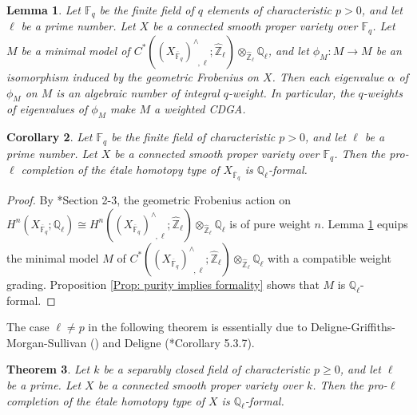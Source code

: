 \documentclass[11pt]{amsart}
\newtheorem{theorem}{Theorem}[section]
\newtheorem{lemma}[theorem]{Lemma}
\newtheorem{corollary}[theorem]{Corollary}
\theoremstyle{definition}
\numberwithin{equation}{section}
\numberwithin{equation}{section}
\newcommand\QQ{\mathbb{Q}}
\newcommand\ZZ{\mathbb{Z}}
\newcommand\FF{\mathbb{F}}
\DeclareMathOperator{\et}{\acute{e}t}
\begin{document}
\begin{lemma}\label{Lem: Frobenius weight on minimal model}
Let $\FF_q$ be the finite field of $q$ elements of characteristic $p>0$, and let $\ell$ be a prime number. Let $X$ be a connected smooth proper variety over $\FF_{q}$. Let $M$ be a minimal model of $C^*((X_{\overline{\FF}_q})^{\wedge}_{\et,\ell};\widehat{\ZZ}_{\ell})\otimes_{\widehat{\ZZ}_{\ell}} \QQ_{\ell}$, and let $\phi_M:M\rightarrow M$ be an isomorphism induced by the geometric Frobenius on $X$. Then
each eigenvalue $\alpha$ of $\phi_M$ on $M$ is an algebraic number of integral $q$-weight. In particular, the $q$-weights of eigenvalues of $\phi_M$ make $M$ a weighted CDGA.
\end{lemma}


\begin{corollary}\label{Cor: Formality for any varieties over finite fields}
Let $\FF_q$ be the finite field of characteristic $p>0$, and let $\ell$ be a prime number. Let $X$ be a connected smooth proper variety over $\FF_{q}$. Then the pro-$\ell$ completion of the \'etale homotopy type of $X_{\overline{\FF}_q}$ is $\QQ_{\ell}$-formal.    
\end{corollary}

\begin{proof}
By \cite{Deligne-Weil-II}\cite{Chiarellotto-le-Stum-on-purity-of-crystalline-cohomology}\cite{Milne-values-of-zeta-functions-of-varieties-over-finite-fields}\cite{Jannsen-weights}*{Section 2-3}, the geometric Frobenius action on $H^n_{\et}(X_{\overline{\FF}_q};\QQ_{\ell})\cong H^n((X_{\overline{\FF}_q})^{\wedge}_{\et,\ell};\widehat{\ZZ}_{\ell})\otimes_{\widehat{\ZZ}_{\ell}}\QQ_{\ell}$ is of pure weight $n$. Lemma \ref{Lem: Frobenius weight on minimal model} equips the minimal model $M$ of $C^*((X_{\overline{\FF}_q})^{\wedge}_{\et,\ell};\widehat{\ZZ}_{\ell})\otimes_{\widehat{\ZZ}_{\ell}} \QQ_{\ell}$ with a compatible weight grading. Proposition \ref{Prop: purity implies formality} shows that $M$ is $\QQ_{\ell}$-formal.
\end{proof}

The case $\ell\neq p$ in the following theorem is essentially due to Deligne-Griffiths-Morgan-Sullivan (\cite{Deligne-Griffiths-Morgan-Sullivan-formality}) and Deligne (\cite{Deligne-Weil-II}*{Corollary 5.3.7}).

\begin{theorem}\label{Thm: formality of varieties}
Let $k$ be a separably closed field of characteristic $p\geq 0$, and let $\ell$ be a prime. Let $X$ be a connected smooth proper variety over $k$. Then the pro-$\ell$ completion of the \'etale homotopy type of $X$ is $\QQ_{\ell}$-formal.
\end{theorem}
\end{document}
